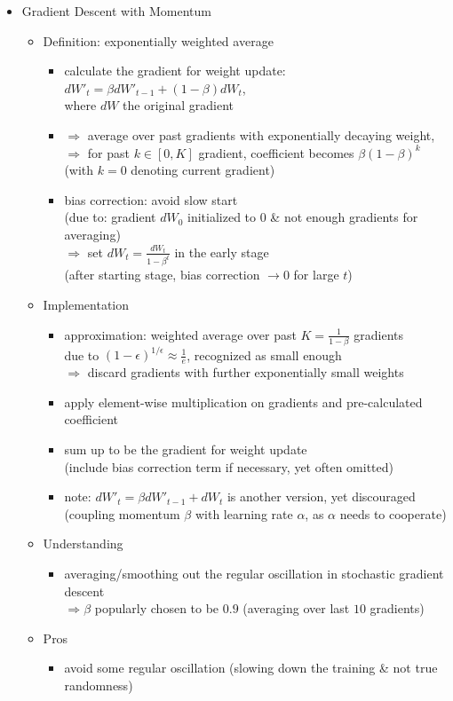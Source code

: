 \begin{itemize}
\item Gradient Descent with Momentum
	\begin{itemize}
	\item Definition: exponentially weighted average
		\begin{itemize}
		\item calculate the gradient for weight update: $dW'_t = \beta dW'_{t-1} + (1-\beta) dW_t$, \\ 
		where $dW$ the original gradient
		\item $\Rightarrow$ average over past gradients with exponentially decaying weight, \\
		$\Rightarrow$ for past $k\in[0,K]$ gradient, coefficient becomes $\beta(1-\beta)^k$ \\ 
		(with $k=0$ denoting current gradient)
		\item bias correction: avoid slow start \\
		(due to: gradient $dW_0$ initialized to $0$ \& not enough gradients for averaging) \\
		$\Rightarrow$ set $dW_t=\frac {dW_t}{1-\beta^t}$ in the early stage \\
		(after starting stage, bias correction $\rightarrow 0$ for large $t$)
		\end{itemize}
	\item Implementation
		\begin{itemize}
		\item approximation: weighted average over past $K=\frac 1 {1-\beta}$ gradients \\
		due to $(1-\epsilon)^{1/\epsilon} \approx \frac 1 e$, recognized as small enough \\
		$\Rightarrow$ discard gradients with further exponentially small weights
		\item apply element-wise multiplication on gradients and pre-calculated coefficient
		\item sum up to be the gradient for weight update \\ 
		(include bias correction term if necessary, yet often omitted)
		\item note: $dW'_t = \beta dW'_{t-1}+dW_t$ is another version, yet discouraged \\
		(coupling momentum $\beta$ with learning rate $\alpha$, as $\alpha$ needs to cooperate)
		\end{itemize}
	\item Understanding
		\begin{itemize}
		\item averaging/smoothing out the regular oscillation in stochastic gradient descent \\
		$\Rightarrow \beta$ popularly chosen to be $0.9$ (averaging over last $10$ gradients) 
		\end{itemize}
	\item Pros
		\begin{itemize}
		\item avoid some regular oscillation (slowing down the training \& not true randomness)
		\end{itemize}
	\end{itemize}
	

\end{itemize}

